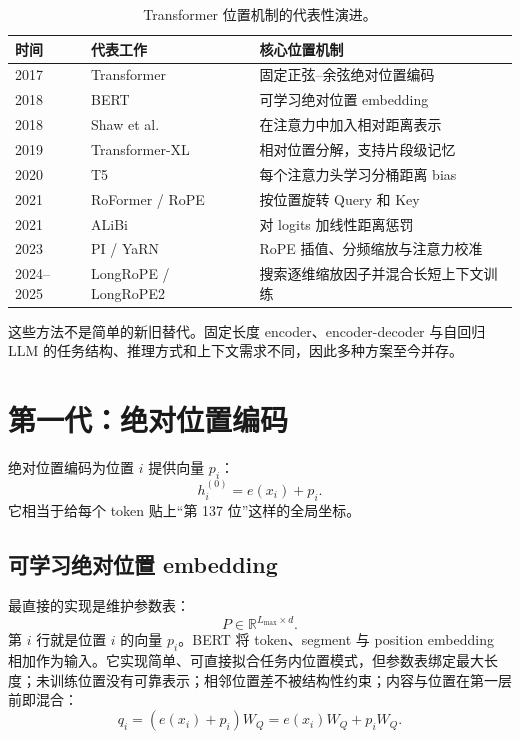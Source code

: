\documentclass[UTF8,fontset=none,a4paper,10pt]{ctexart}
\newcommand{\R}{\mathbb{R}}
\begin{document}
\begin{table}[htbp]
\centering
\small
\begin{tabularx}{\linewidth}{@{}p{1.2cm}p{3.5cm}X@{}}
\toprule
时间 & 代表工作 & 核心位置机制 \\
\midrule
2017 & Transformer & 固定正弦--余弦绝对位置编码 \\
2018 & BERT & 可学习绝对位置 embedding \\
2018 & Shaw et al. & 在注意力中加入相对距离表示 \\
2019 & Transformer-XL & 相对位置分解，支持片段级记忆 \\
2020 & T5 & 每个注意力头学习分桶距离 bias \\
2021 & RoFormer / RoPE & 按位置旋转 Query 和 Key \\
2021 & ALiBi & 对 logits 加线性距离惩罚 \\
2023 & PI / YaRN & RoPE 插值、分频缩放与注意力校准 \\
2024--2025 & LongRoPE / LongRoPE2 & 搜索逐维缩放因子并混合长短上下文训练 \\
\bottomrule
\end{tabularx}
\caption{Transformer 位置机制的代表性演进。}
\label{tab:timeline}
\end{table}

这些方法不是简单的新旧替代。固定长度 encoder、encoder-decoder 与自回归 LLM 的任务结构、推理方式和上下文需求不同，因此多种方案至今并存。

\section{第一代：绝对位置编码}

绝对位置编码为位置 $i$ 提供向量 $p_i$：
\begin{equation}
  h_i^{(0)}=e(x_i)+p_i.
  \label{eq:absolute}
\end{equation}
它相当于给每个 token 贴上“第 137 位”这样的全局坐标。

\subsection{可学习绝对位置 embedding}

最直接的实现是维护参数表：
\begin{equation}
  P\in\R^{L_{\max}\times d}.
  \label{eq:learned-table}
\end{equation}
第 $i$ 行就是位置 $i$ 的向量 $p_i$。BERT 将 token、segment 与 position embedding 相加作为输入\cite{devlin2019}。它实现简单、可直接拟合任务内位置模式，但参数表绑定最大长度；未训练位置没有可靠表示；相邻位置差不被结构性约束；内容与位置在第一层前即混合：
\begin{equation}
  q_i=(e(x_i)+p_i)W_Q=e(x_i)W_Q+p_iW_Q.
  \label{eq:absolute-proj}
\end{equation}
\end{document}
